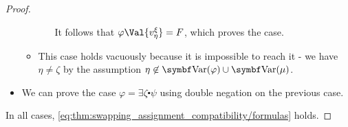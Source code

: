 \begin{proof}
\begin{itemize}
\begin{itemize}
\begin{itemize}
        It follows that \( \varphi\Val{v_\eta^\xi} = F \), which proves the case.
      \end{itemize}

      \item This case holds vacuously because it is impossible to reach it - we have \( \eta \neq \zeta \) by the assumption \( \eta \not\in \Bold{Var}(\varphi) \cup \Bold{Var}(\mu) \).
    \end{itemize}

    \item We can prove the case \( \varphi = \exists \zeta \centerdot \psi \) using double negation on the previous case.
  \end{itemize}

  In all cases, \eqref{eq:thm:swapping_assignment_compatibility/formulas} holds.
\end{proof}

